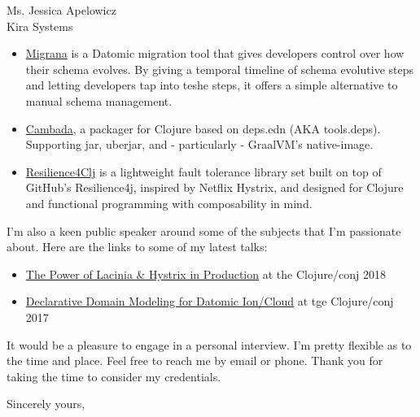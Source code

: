 \documentclass{letter} %
\begin{document}
\begin{letter}{Ms. Jessica Apelowicz \\
Kira Systems}
\begin{itemize}
\item \href{https://github.com/luchiniatwork/migrana}{Migrana} is a
  Datomic migration tool that gives developers control over how their
  schema evolves. By giving a temporal timeline of schema evolutive
  steps and letting developers tap into teshe steps, it offers a
  simple alternative to manual schema management.

\item \href{https://github.com/luchiniatwork/cambada}{Cambada}, a
  packager for Clojure based on deps.edn (AKA tools.deps). Supporting
  jar, uberjar, and - particularly - GraalVM’s native-image.

\item
  \href{https://github.com/luchiniatwork/resilience4clj-circuitbreaker}{Resilience4Clj}
  is a lightweight fault tolerance library set built on top of
  GitHub’s Resilience4j, inspired by Netflix Hystrix, and designed for
  Clojure and functional programming with composability in mind.

\end{itemize}

\noindent I'm also a keen public speaker around some of the subjects
that I'm passionate about. Here are the links to some of my latest
talks:

\begin{itemize}
  \item \href{https://www.youtube.com/watch?v=uL9QavmAInw}{The Power
    of Lacinia \& Hystrix in Production} at the Clojure/conj 2018
  \item \href{https://www.youtube.com/watch?v=EDojA_fahvM}{Declarative
    Domain Modeling for Datomic Ion/Cloud} at tge Clojure/conj 2017
\end{itemize}

\noindent It would be a pleasure to engage in a personal
interview. I’m pretty flexible as to the time and place. Feel free to
reach me by email or phone. Thank you for taking the time to consider
my credentials.

\closing{Sincerely yours,}


\end{letter}
\end{document}
